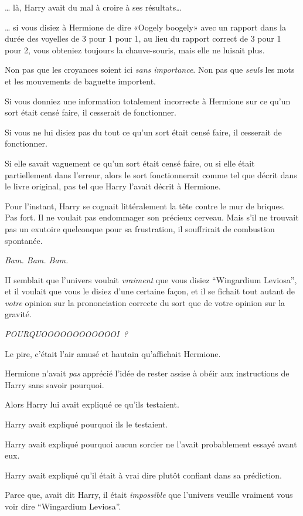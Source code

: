 … là, Harry avait du mal à croire à ses résultats…

… si vous disiez à Hermione de dire «Oogely boogely» avec un rapport dans la durée des voyelles de 3 pour 1 pour 1, au lieu du rapport correct de 3 pour 1 pour 2, vous obteniez toujours la chauve-souris, mais elle ne luisait plus.

Non pas que les croyances soient ici \emph{sans importance}. Non pas que \emph{seuls} les mots et les mouvements de baguette importent.

Si vous donniez une information totalement incorrecte à Hermione sur ce qu'un sort était censé faire, il cesserait de fonctionner.

Si vous ne lui disiez pas du tout ce qu'un sort était censé faire, il cesserait de fonctionner.

Si elle savait vaguement ce qu'un sort était censé faire, ou si elle était partiellement dans l'erreur, alors le sort fonctionnerait comme tel que décrit dans le livre original, pas tel que Harry l'avait décrit à Hermione.

Pour l'instant, Harry se cognait littéralement la tête contre le mur de briques. Pas fort. Il ne voulait pas endommager son précieux cerveau. Mais s'il ne trouvait pas un exutoire quelconque pour sa frustration, il souffrirait de combustion spontanée.

\emph{Bam. Bam. Bam.}

II semblait que l'univers voulait \emph{vraiment} que vous disiez “Wingardium Leviosa”, et il voulait que vous le disiez d'une certaine façon, et il se fichait tout autant de \emph{votre} opinion sur la prononciation correcte du sort que de votre opinion sur la gravité.

\emph{POURQUOOOOOOOOOOOOI~?}

Le pire, c'était l'air amusé et hautain qu'affichait Hermione.

Hermione n'avait \emph{pas} apprécié l'idée de rester assise à obéir aux instructions de Harry sans savoir pourquoi.

Alors Harry lui avait expliqué ce qu'ils testaient.

Harry avait expliqué pourquoi ils le testaient.

Harry avait expliqué pourquoi aucun sorcier ne l'avait probablement essayé avant eux.

Harry avait expliqué qu'il était à vrai dire plutôt confiant dans sa prédiction.

Parce que, avait dit Harry, il était \emph{impossible} que l'univers veuille vraiment vous voir dire “Wingardium Leviosa”.

